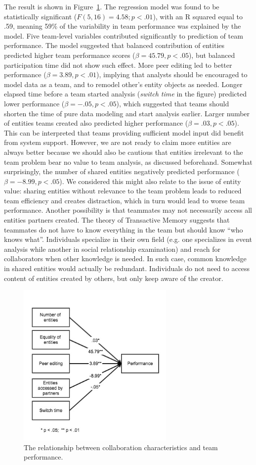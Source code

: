 The result is shown in Figure~\ref{fig:regression}. The regression model was found to be statistically significant ($F(5,16)=4.58; p<.01$), with an R squared equal to .59, meaning 59\% of the variability in team performance was explained by the model. Five team-level variables contributed significantly to prediction of team performance. The model suggested that balanced contribution of entities predicted higher team performance scores ($\beta=45.79, p<.05$), but balanced participation time did not show such effect. More peer editing led to better performance ($\beta=3.89, p<.01$), implying that analysts should be encouraged to model data as a team, and to remodel other's entity objects as needed. Longer elapsed time before a team started analysis (\emph{switch time} in the figure) predicted lower performance ($\beta=-.05, p<.05$), which suggested that teams should shorten the time of pure data modeling and start analysis earlier. Larger number of entities teams created also predicted higher performance ($\beta=.03, p<.05$). This can be interpreted that teams providing sufficient model input did benefit from system support. However, we are not ready to claim more entities are always better  because we should also be cautious that entities irrelevant to the team problem bear no value to team analysis, as discussed beforehand. Somewhat surprisingly, the number of shared entities negatively predicted performance ($\beta=-8.99, p<.05$).
We considered this might also relate to the issue of entity value: sharing entities without relevance to the team problem leads to reduced team efficiency and creates distraction, which in turn would lead to worse team performance. Another possibility is that teammates may not necessarily access all entities partners created. The theory of Transactive Memory \cite{Wegner1987} suggests that teammates do not have to know everything in the team but should know ``who knows what''. Individuals specialize in their own field (e.g. one specializes in event analysis while another in social relationship examination) and reach for collaborators when other knowledge is needed. In such case, common knowledge in shared entities would actually be redundant. Individuals do not need to access content of entities created by others, but only keep aware of the creator.

\begin{figure}
\centering
\includegraphics[width=3.0000in]{img/team_analysis.jpg}
\caption{The relationship between collaboration characteristics and team performance.\label{fig:regression}}
\end{figure}
